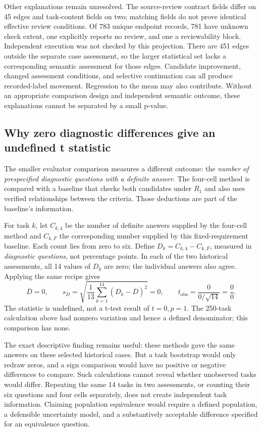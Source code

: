 Other explanations remain unresolved. The source-review contract fields differ on 45 edges and task-content fields on two; matching fields do not prove identical effective review conditions. Of 783 unique endpoint records, 781 have unknown check extent, one explicitly reports no review, and one a reviewability block. Independent execution was not checked by this projection. There are 451 edges outside the separate case assessment, so the larger statistical set lacks a corresponding semantic assessment for those edges. Candidate improvement, changed assessment conditions, and selective continuation can all produce recorded-label movement. Regression to the mean may also contribute. Without an appropriate comparison design and independent semantic outcome, these explanations cannot be separated by a small p-value.

\subsection{Why zero diagnostic differences give an undefined t statistic}
\label{subsec:zero-differences}
The smaller evaluator comparison measures a different outcome: the \emph{number of prespecified diagnostic questions with a definite answer}. The four-cell method is compared with a baseline that checks both candidates under $R_1$ and also uses verified relationships between the criteria. Those deductions are part of the baseline's information.

For task $k$, let $C_{k,4}$ be the number of definite answers supplied by the four-cell method and $C_{k,F}$ the corresponding number supplied by this fixed-requirement baseline. Each count lies from zero to six. Define $D_k=C_{k,4}-C_{k,F}$, measured in \emph{diagnostic questions}, not percentage points. In each of the two historical assessments, all 14 values of $D_k$ are zero; the individual answers also agree. Applying the same recipe gives
\[
\overline D=0,\qquad
s_D=\sqrt{\frac{1}{13}\sum_{k=1}^{14}(D_k-\overline D)^2}=0,
\qquad t_{\mathrm{obs}}=\frac{0}{0/\sqrt{14}}=\frac{0}{0}.
\]
The statistic is undefined, not a t-test result of $t=0,p=1$. The 250-task calculation above had nonzero variation and hence a defined denominator; this comparison has none.

The exact descriptive finding remains useful: these methods gave the same answers on these selected historical cases. But a task bootstrap would only redraw zeros, and a sign comparison would have no positive or negative differences to compare. Such calculations cannot reveal whether unobserved tasks would differ. Repeating the same 14 tasks in two assessments, or counting their six questions and four cells separately, does not create independent task information. Claiming population equivalence would require a defined population, a defensible uncertainty model, and a substantively acceptable difference specified for an equivalence question.

